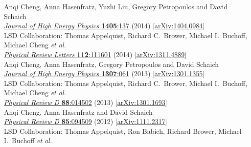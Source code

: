 \begin{spacelist}
\begin{revnumerate}
      Anqi Cheng, Anna Hasenfratz, Yuzhi Liu, Gregory Petropoulos and David Schaich \\
      \href{https://doi.org/10.1007/JHEP05(2014)137}{\textit{Journal of High Energy Physics} \textbf{1405}:137} (2014) [\href{http://arxiv.org/abs/1404.0984}{arXiv:1404.0984}]
    \pagebreakitem
       \\
      LSD Collaboration: Thomas Appelquist, Richard C.~Brower, Michael I.~Buchoff, Michael Cheng \textit{et al.} \\ %
      \href{https://doi.org/10.1103/PhysRevLett.112.111601}{\textit{Physical Review Letters} \textbf{112}:111601} (2014) [\href{http://arxiv.org/abs/1311.4889}{arXiv:1311.4889}]
    \pagebreakitem
       \\
      Anqi Cheng, Anna Hasenfratz, Gregory Petropoulos and David Schaich \\
      \href{https://doi.org/10.1007/JHEP07(2013)061}{\textit{Journal of High Energy Physics} \textbf{1307}:061} (2013) [\href{http://arxiv.org/abs/1301.1355}{arXiv:1301.1355}]
    \pagebreakitem
       \\
      LSD Collaboration: Thomas Appelquist, Richard C.~Brower, Michael I.~Buchoff, Michael Cheng \textit{et al.} \\ %
      \href{https://doi.org/10.1103/PhysRevD.88.014502}{\textit{Physical Review D} \textbf{88}:014502} (2013) [\href{http://arxiv.org/abs/1301.1693}{arXiv:1301.1693}]
    \pagebreakitem
       \\
      Anqi Cheng, Anna Hasenfratz and David Schaich \\
      \href{https://doi.org/10.1103/PhysRevD.85.094509}{\textit{Physical Review D} \textbf{85}:094509} (2012) [\href{http://arxiv.org/abs/1111.2317}{arXiv:1111.2317}]
    \pagebreakitem
       \\
      LSD Collaboration: Thomas Appelquist, Ron Babich, Richard Brower, Michael I.~Buchoff \textit{et al.} \\ %

\end{revnumerate}
\end{spacelist}
